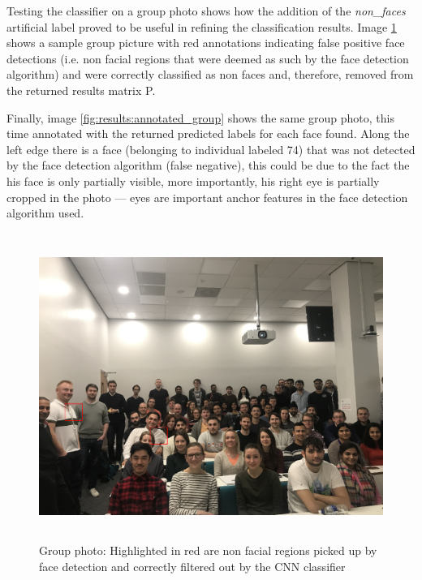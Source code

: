 \documentclass[11pt]{article}
\begin{document}
        Testing the classifier on a group photo shows how the addition of the \textit{non\_faces} artificial label proved to be useful in refining the classification results. Image \ref{fig:results:non_faces} shows a sample group picture with red annotations indicating false positive face detections (i.e. non facial regions that were deemed as such by the face detection algorithm) and were correctly classified as non faces and, therefore, removed from the returned results matrix P.

        Finally, image \ref{fig:results:annotated_group} shows the same group photo, this time annotated with the returned predicted labels for each face found. Along the left edge there is a face (belonging to individual labeled 74) that was not detected by the face detection algorithm (false negative), this could be due to the fact the his face is only partially visible, more importantly, his right eye is partially cropped in the photo --- eyes are important anchor features in the face detection algorithm used.

        \begin{figure}[p]
            \centering
            \includegraphics[height=10cm]{./Images/results/non_faces.png}
            \caption{Group photo: Highlighted in red are non facial regions picked up by face detection and correctly filtered out by the CNN classifier}
            \label{fig:results:non_faces}
        \end{figure}
\end{document}
